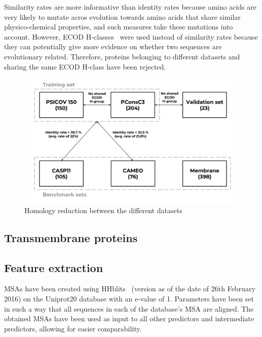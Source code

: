     Similarity rates are more informative than identity rates because amino acids
    are very likely to mutate acros evolution towards amino acids that share
    similar physico-chemical properties, and such measures take these mutations
    into account. However, ECOD H-classes~\cite{10.1371/journal.pcbi.1003926}
    were used instead of similarity rates because they can potentially give more
    evidence on whether two sequences are evolutionary related.
    Therefore, proteins belonging to different datasets and sharing the same
    ECOD H-class have been rejected.


    \begin{figure}[H]
      \begin{center}
        \includegraphics[width=\textwidth, keepaspectratio]{imgs/datasets.png}
         \caption{Homology reduction between the different datasets}
        \label{homology_reduction}
      \end{center}
    \end{figure}

  \subsection{Transmembrane proteins}

    \todo{}

  \subsection{Feature extraction}

    MSAs have been created using HHblits~\cite{HHblits} (version as of the date of 26th February 2016) on the Uniprot20 database
    with an e-value of 1. Parameters have been set in such a way that all sequences in each of the database's MSA are aligned.
    The obtained MSAs have been used as input to all other predictors and intermediate predictors, allowing for easier comparability.

